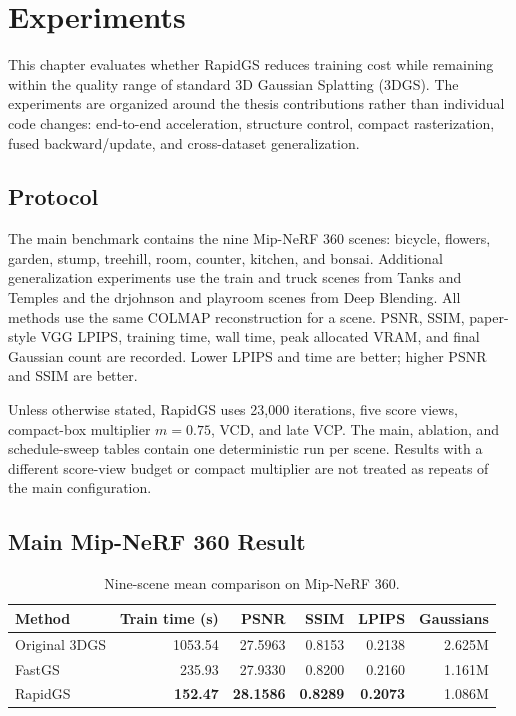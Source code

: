 \chapter{Experiments}
\label{chap:experiments}

This chapter evaluates whether RapidGS reduces training cost while remaining
within the quality range of standard 3D Gaussian Splatting (3DGS). The
experiments are
organized around the thesis contributions rather than individual code changes:
end-to-end acceleration, structure control, compact rasterization, fused
backward/update, and cross-dataset generalization.

\section{Protocol}

The main benchmark contains the nine Mip-NeRF 360 scenes: bicycle, flowers,
garden, stump, treehill, room, counter, kitchen, and bonsai. Additional
generalization experiments use the train and truck scenes from Tanks and
Temples and the drjohnson and playroom scenes from Deep Blending. All methods
use the same COLMAP reconstruction for a scene. PSNR, SSIM, paper-style VGG
LPIPS, training time, wall time, peak allocated VRAM, and final Gaussian count
are recorded. Lower LPIPS and time are better; higher PSNR and SSIM are better.

Unless otherwise stated, RapidGS uses 23,000 iterations, five score views,
compact-box multiplier $m=0.75$, VCD, and late VCP. The
main, ablation, and schedule-sweep tables contain one deterministic run per
scene. Results with a different score-view budget or compact multiplier are
not treated as repeats of the main configuration.

\section{Main Mip-NeRF 360 Result}

\begin{table}[H]
\centering
\caption{Nine-scene mean comparison on Mip-NeRF 360.}
\label{tab:main-result}
\begin{tabular}{lrrrrr}
\toprule
Method & Train time (s) & PSNR & SSIM & LPIPS & Gaussians \\
\midrule
Original 3DGS & 1053.54 & 27.5963 & 0.8153 & 0.2138 & 2.625M \\
FastGS & 235.93 & 27.9330 & 0.8200 & 0.2160 & 1.161M \\
RapidGS & \textbf{152.47} & \textbf{28.1586} & \textbf{0.8289} &
\textbf{0.2073} & 1.086M \\
\bottomrule
\end{tabular}
\end{table}

